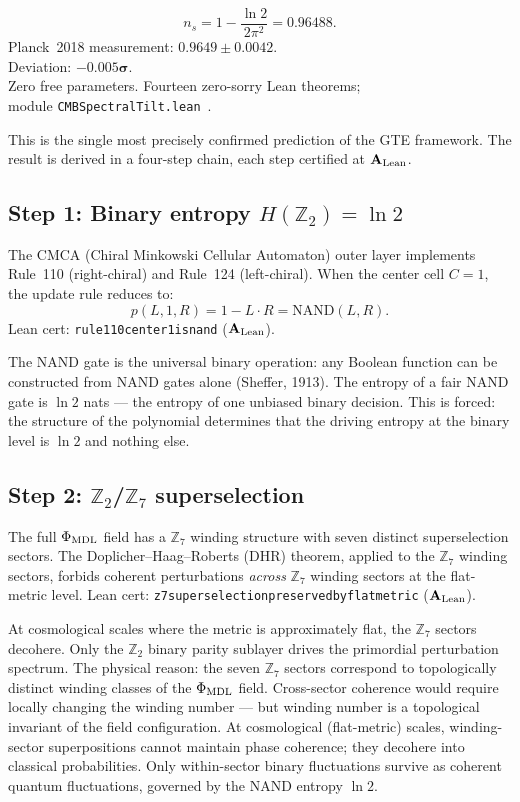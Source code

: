 \documentclass[11pt,a4paper]{article}
\newcommand{\lean}[1]{%
  \penalty-100
  \begingroup\def\_{\textunderscore\allowbreak}\texttt{#1}\endgroup}
\newcommand{\CatAL}{\ensuremath{\mathbf{A}_{\rm Lean}}}
\newcommand{\ns}{n_s}
\begin{document}
\begin{tcolorbox}[colback=boxorange,colframe=orange!60!black,
  title={Result: CMB Spectral Index (\CatAL)}]
\[
  \ns = 1 - \frac{\ln 2}{2\pi^2} = 0.96488.
\]
Planck~2018 measurement: $0.9649 \pm 0.0042$.\\[2pt]
Deviation: $\mathbf{-0.005\sigma}$.\\[2pt]
Zero free parameters. Fourteen zero-sorry Lean theorems;\\[2pt]
module \lean{CMBSpectralTilt.lean}~\cite{SpivackGTECosmology,SpivackGTECompleteFramework}.
\end{tcolorbox}

This is the single most precisely confirmed prediction of the GTE framework.
The result is derived in a four-step chain, each step certified at \CatAL.

\subsection{Step 1: Binary entropy $H(\mathbb{Z}_2) = \ln 2$}

The CMCA (Chiral Minkowski Cellular Automaton) outer layer implements
Rule~110 (right-chiral) and Rule~124 (left-chiral).
When the center cell $C = 1$, the update rule reduces to:
\[
  p(L, 1, R) = 1 - L \cdot R = \mathrm{NAND}(L, R).
\]
Lean cert: \lean{rule110\_center1\_is\_nand} (\CatAL).

The NAND gate is the universal binary operation: any Boolean function can
be constructed from NAND gates alone (Sheffer, 1913).
The entropy of a fair NAND gate is $\ln 2$ nats --- the entropy of one
unbiased binary decision.
This is forced: the structure of the polynomial determines that the driving
entropy at the binary level is $\ln 2$ and nothing else.

\subsection{Step 2: $\mathbb{Z}_2$/$\mathbb{Z}_7$ superselection}

The full $\Phi_{\rm MDL}$ field has a $\mathbb{Z}_7$ winding structure with
seven distinct superselection sectors.
The Doplicher--Haag--Roberts (DHR) theorem, applied to the $\mathbb{Z}_7$
winding sectors, forbids coherent perturbations \emph{across} $\mathbb{Z}_7$
winding sectors at the flat-metric level.
Lean cert: \lean{z7\_superselection\_preserved\_by\_flat\_metric} (\CatAL).

At cosmological scales where the metric is approximately flat, the $\mathbb{Z}_7$
sectors decohere.
Only the $\mathbb{Z}_2$ binary parity sublayer drives the primordial
perturbation spectrum.
The physical reason: the seven $\mathbb{Z}_7$ sectors correspond to topologically
distinct winding classes of the $\Phi_{\rm MDL}$ field.
Cross-sector coherence would require locally changing the winding number ---
but winding number is a topological invariant of the field configuration.
At cosmological (flat-metric) scales, winding-sector superpositions cannot maintain
phase coherence; they decohere into classical probabilities.
Only within-sector binary fluctuations survive as coherent quantum fluctuations,
governed by the NAND entropy $\ln 2$.
\end{document}
